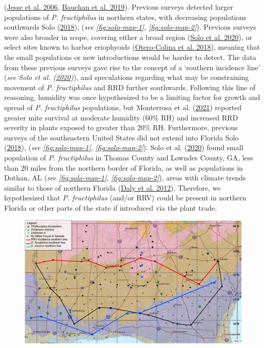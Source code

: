 \documentclass{ufdissertation}[overrideChapters] %
\begin{document}
{(\protect\hyperlink{ref-Jesse2006}{Jesse et al. 2006}, \protect\hyperlink{ref-Bauchan2019}{Bauchan et al. 2019}). Previous surveys detected larger populations of \emph{P. fructiphilus} in northern states, with decreasing populations southwards Solo (\protect\hyperlink{ref-Solo2018}{2018}), (\emph{see} \emph{\ref{fig:solo-map-1}}, \emph{\ref{fig:solo-map-2}}). Previous surveys were also broader in scope, covering either a broad region (\protect\hyperlink{ref-Solo2020}{Solo et al. 2020}), or select sites known to harbor eriophyoids (\protect\hyperlink{ref-Otero-Colina2018}{Otero-Colina et al. 2018}), meaning that the small populations or new introductions would be harder to detect. The data from these previous surveys gave rise to the concept of a `southern incidence line' (\emph{see Solo et al. (\protect\hyperlink{ref-Solo2020}{2020})}), and speculations regarding what may be constraining movement of \emph{P. fructiphilus} and RRD further southwards. Following this line of reasoning, humidity was once hypothesized to be a limiting factor for growth and spread of \emph{P. fructiphilus} populations, but Monterrosa et al. (\protect\hyperlink{ref-Monterrosa2021}{2021}) reported greater mite survival at moderate humidity (60\% RH) and increased RRD severity in plants exposed to greater than 20\% RH. Furthermore, previous surveys of the southeastern United States did not extend into Florida Solo (\protect\hyperlink{ref-Solo2018}{2018}), (\emph{see} \emph{\ref{fig:solo-map-1}}, \emph{\ref{fig:solo-map-2}}). Solo et al. (\protect\hyperlink{ref-Solo2020}{2020}) found small population of \emph{P. fructiphilus} in Thomas County and Lowndes County, GA, less than 20 miles from the northern border of Florida, as well as populations in Dothan, AL (\emph{see} \emph{\ref{fig:solo-map-1}}, \emph{\ref{fig:solo-map-2}}), areas with climate trends similar to those of northern Florida (\protect\hyperlink{ref-Daly2012}{Daly et al. 2012}). Therefore, we hypothesized that \emph{P. fructiphilus} (and/or RRV) could be present in northern Florida or other parts of the state if introduced via the plant trade.
\begin{figure}

{\centering \includegraphics[width=1\linewidth]{figure/full-1288fig1} 

}
\end{figure}}
\end{document}
